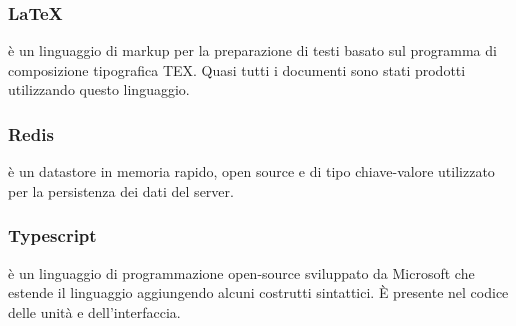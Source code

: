 	\subsubsection{LaTeX}
	 è un linguaggio di markup per la preparazione di testi basato sul programma di composizione tipografica TEX. Quasi tutti i documenti sono stati prodotti utilizzando questo linguaggio.
	
	\subsubsection{Redis}
	 è un datastore in memoria rapido, open source e di tipo chiave-valore utilizzato per la persistenza dei dati del server.

	\subsubsection{Typescript}
	 è un linguaggio di programmazione open-source sviluppato da Microsoft che estende il linguaggio  aggiungendo alcuni costrutti sintattici. È presente nel codice delle unità e dell'interfaccia.
